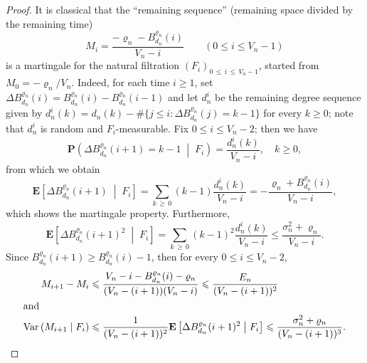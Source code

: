 \documentclass[10pt]{amsart}
\theoremstyle{definition}\newtheorem{defi}[theo]{Definition}\newtheorem{rema}[theo]{Remark}\newtheorem{exam}[theo]{Example}\newtheorem{exem}[theo]{Example}\newtheorem{nota}[theo]{Notation}
\newcommand{\ensembles}[1]{\mathbf{#1}}
\renewcommand{\P}{\ensembles{P}}
\newcommand{\E}{\ensembles{E}}
\newcommand{\Prc}[2]{\P\left(#1 \;\middle|\; #2\right)}
\newcommand{\Esc}[2]{\E\left[#1 \;\middle|\; #2\right]}
\newcommand{\1}{\ensembles{1}}
\renewcommand{\le}{\leqslant}
\renewcommand{\ge}{\geqslant}
\newcommand{\Var}{\mathrm{Var}}
\newcommand{\Bfn}{B_{d_n}^{\varrho_n}}
\newcommand{\edges}{E}
\newcommand{\vertices}{V}
\providecommand{\?}{}
\begin{document}
\begin{proof}
It is classical that the ``remaining sequence'' (remaining space divided by the remaining time)
\[
M_i = \frac{- \varrho_n - \Bfn(i)}{\vertices_n-i}
\qquad \left(0 \le i \le \vertices_n - 1\right)
\]
is a martingale for the natural filtration $(F_i)_{0\, \le\,i\,\le\,\vertices_n - 1}$, started from $M_0 = -\varrho_n / \vertices_n$. Indeed, for each time $i \ge 1$, set $\Delta\Bfn(i) = \Bfn(i) - \Bfn(i-1)$ and let $d_n^{i}$ be the remaining degree sequence given by $d_n^{i}(k) = d_n(k) - \#\{j \le i : \Delta\Bfn(j) = k-1\}$ for every $k \ge 0$; note that $d_n^{i}$ is random and $F_i$-measurable. Fix $0 \le i \le \vertices_n-2$; then we have
\[
\Prc{\Delta\Bfn(i+1) = k-1}{F_i} = \frac{d_n^{i}(k)}{\vertices_n-i},\quad k \ge 0,
\]
from which we obtain
\[
\Esc{\Delta\Bfn(i+1)}{F_i} = \sum_{k\,\ge\,0} (k-1) \frac{d_n^{i}(k)}{\vertices_n-i} = - \frac{\varrho_n + \Bfn(i)}{\vertices_n-i},
\]
which shows the martingale property. Furthermore,
\[
\Esc{\Delta\Bfn(i+1)^2}{F_i} = \sum_{k\,\ge\,0} (k-1)^2 \frac{d_n^{i}(k)}{\vertices_n-i}
\le \frac{\sigma_n^2+\varrho_n}{\vertices_n-i}.
\]
Since $\Bfn(i+1) \ge \Bfn(i) - 1$, then for every $0 \le i \le \vertices_n - 2$,
\begin{align*}
M_{i+1} - M_i
&\le \frac{\vertices_n-i - \Bfn(i) - \varrho_n}{(\vertices_n-(i+1)) (\vertices_n-i)}
\le \frac{\edges_n}{(\vertices_n-(i+1))^2}
\\
\intertext{and}
\Var\left(M_{i+1} \mid F_i\right)
&\le \frac{1}{(\vertices_n-(i+1))^2} \Esc{\Delta\Bfn(i+1)^2}{F_i}
\le \frac{\sigma_n^2 + \varrho_n}{(\vertices_n-(i+1))^3}.
\end{align*}




\end{proof}
\end{document}
